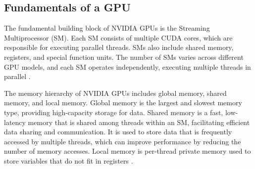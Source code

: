 \subsection{Fundamentals of a GPU}

The fundamental building block of NVIDIA GPUs is the Streaming Multiprocessor (SM). Each SM consists of multiple CUDA cores, which are responsible for executing parallel threads. SMs also include shared memory, registers, and special function units. The number of SMs varies across different GPU models, and each SM operates independently, executing multiple threads in parallel \cite{cuda-sanders10, gpu-nickolls10}.

The memory hierarchy of NVIDIA GPUs includes global memory, shared memory, and local memory. Global memory is the largest and slowest memory type, providing high-capacity storage for data. Shared memory is a fast, low-latency memory that is shared among threads within an SM, facilitating efficient data sharing and communication. It is used to store data that is frequently accessed by multiple threads, which can improve performance by reducing the number of memory accesses. Local memory is per-thread private memory used to store variables that do not fit in registers \cite{cuda-sanders10, gpu-nickolls10}.




